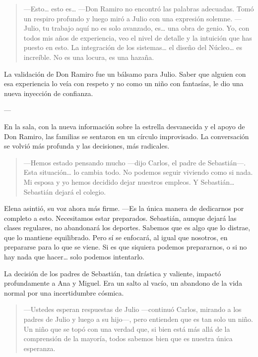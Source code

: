 \documentclass[a4paper,12pt]{book}
\begin{document}
\begin{quote}
    —Esto… esto es… —Don Ramiro no encontró las palabras adecuadas. Tomó un respiro profundo y luego miró a Julio con una expresión solemne. —Julio, tu trabajo aquí no es solo avanzado, es… una obra de genio. Yo, con todos mis años de experiencia, veo el nivel de detalle y la intuición que has puesto en esto. La integración de los sistemas… el diseño del Núcleo… es increíble. No es una locura, es una hazaña.
\end{quote}

La validación de Don Ramiro fue un bálsamo para Julio. Saber que alguien con esa experiencia lo veía con respeto y no como un niño con fantasías, le dio una nueva inyección de confianza.

---

En la sala, con la nueva información sobre la estrella desvanecida y el apoyo de Don Ramiro, las familias se sentaron en un círculo improvisado. La conversación se volvió más profunda y las decisiones, más radicales.

\begin{quote}
    —Hemos estado pensando mucho —dijo Carlos, el padre de Sebastián—. Esta situación… lo cambia todo. No podemos seguir viviendo como si nada. Mi esposa y yo hemos decidido dejar nuestros empleos. Y Sebastián… Sebastián dejará el colegio.
\end{quote}

Elena asintió, su voz ahora más firme. —Es la única manera de dedicarnos por completo a esto. Necesitamos estar preparados. Sebastián, aunque dejará las clases regulares, no abandonará los deportes. Sabemos que es algo que lo distrae, que lo mantiene equilibrado. Pero sí se enfocará, al igual que nosotros, en prepararse para lo que se viene. Si es que siquiera podemos prepararnos, o si no hay nada que hacer… solo podemos intentarlo.

La decisión de los padres de Sebastián, tan drástica y valiente, impactó profundamente a Ana y Miguel. Era un salto al vacío, un abandono de la vida normal por una incertidumbre cósmica.

\begin{quote}
    —Ustedes esperan respuestas de Julio —continuó Carlos, mirando a los padres de Julio y luego a su hijo—, pero entienden que es tan solo un niño. Un niño que se topó con una verdad que, si bien está más allá de la comprensión de la mayoría, todos sabemos bien que es nuestra única esperanza.
\end{quote}
\end{document}
